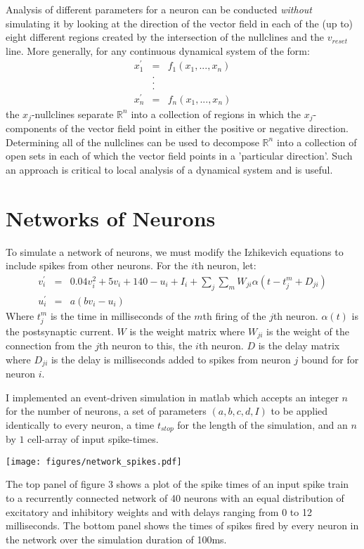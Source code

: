 \documentclass{elsart3p}
\begin{document}
Analysis of different parameters for a neuron can be conducted \textit{without} simulating it by looking at the direction of the vector field in each of the (up to) eight different regions created by the intersection of the nullclines and the $v_{reset}$ line.  More generally, for any continuous dynamical system of the form:
\begin{eqnarray*}
x_{1}^{\prime} &=& f_{1}(x_{1},...,x_{n}) \\
&.&\\
&.&\\
&.&\\
x_{n}^{\prime} &=& f_{n}(x_{1},...,x_{n})
\end{eqnarray*}
the $x_{j}$-nullclines separate $\mathbb{R}^{n}$ into a collection of regions in which the $x_{j}$-components of the vector field point in either the positive or negative direction.  Determining all of the nullclines can be used to decompose $\mathbb{R}^{n}$ into a collection of open sets in each of which the vector field points in a 'particular direction'.  Such an approach is critical to local analysis of a dynamical system and is useful.
\section{Networks of Neurons}
To simulate a network of neurons, we must modify the Izhikevich equations to include spikes from other neurons.  For the $i$th neuron, let:
\begin{eqnarray*}
v_{i}^{\prime} &=& 0.04v_{i}^{2} + 5v_{i} + 140 - u_{i} + I_{i} + \sum_{j} \sum_{m} W_{ji} \alpha(t - t_{j}^{m} + D_{ji})\\
u_{i}^{\prime} &=& a(bv_{i} - u_{i}) 
\end{eqnarray*}
Where $t_{j}^{m}$ is the time in milliseconds of the $m$th firing of the $j$th neuron.  $\alpha(t)$ is the postsynaptic current.  $W$ is the weight matrix where $W_{ji}$ is the weight of the connection from the $j$th neuron to this, the $i$th neuron.  $D$ is the delay matrix where $D_{ji}$ is the delay is milliseconds added to spikes from neuron $j$ bound for for neuron $i$.

I implemented an event-driven simulation in matlab which accepts an integer $n$ for the number of neurons, a set of parameters $(a,b,c,d,I)$ to be applied identically to every neuron, a time $t_{stop}$ for the length of the simulation, and an $n$ by $1$ cell-array of input spike-times. 

\texttt{[image: figures/network\_spikes.pdf]}

The top panel of figure 3 shows a plot of the spike times of an input spike train to a recurrently connected network of 40 neurons with an equal distribution of excitatory and inhibitory weights and with delays ranging from 0 to 12 milliseconds.  The bottom panel shows the times of spikes fired by every neuron in the network over the simulation duration of 100ms.
\end{document}
